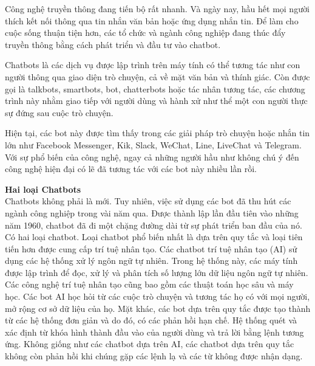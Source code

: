 Công nghệ truyền thông đang tiến bộ rất nhanh. Và ngày nay, hầu hết mọi người thích kết nối thông qua tin nhắn văn bản hoặc ứng dụng nhắn tin.
Để làm cho cuộc sống thuận tiện hơn, các tổ chức và ngành công nghiệp đang thúc đẩy truyền thông bằng cách phát triển và đầu tư vào chatbot.

Chatbots là các dịch vụ được lập trình trên máy tính có thể tương tác như con người thông qua giao diện trò chuyện, cả về mặt văn bản và thính giác. Còn được gọi là talkbots, smartbots, bot, chatterbots hoặc tác nhân tương tác, các chương trình này nhằm giao tiếp với người dùng và hành xử như thể một con người thực sự đứng sau cuộc trò chuyện.

Hiện tại, các bot này được tìm thấy trong các giải pháp trò chuyện hoặc nhắn tin lớn như Facebook Messenger, Kik, Slack, WeChat, Line, LiveChat và Telegram. Với sự phổ biến của công nghệ, ngay cả những người hầu như không chú ý đến công nghệ hiện đại có lẽ đã tương tác với các bot này nhiều lần rồi.

\textbf{Hai loại Chatbots} \\[0.2em]
Chatbots không phải là mới. Tuy nhiên, việc sử dụng các bot đã thu hút các ngành công nghiệp trong vài năm qua. Được thành lập lần đầu tiên vào những năm 1960, chatbot đã đi một chặng đường dài từ sự phát triển ban đầu của nó. Có hai loại chatbot. Loại chatbot phổ biến nhất là dựa trên quy tắc và loại tiên tiến hơn được cung cấp trí tuệ nhân tạo.
Các chatbot trí tuệ nhân tạo (AI) sử dụng các hệ thống xử lý ngôn ngữ tự nhiên. Trong hệ thống này, các máy tính được lập trình để đọc, xử lý và phân tích số lượng lớn dữ liệu ngôn ngữ tự nhiên. Các công nghệ trí tuệ nhân tạo cũng bao gồm các thuật toán học sâu và máy học. Các bot AI học hỏi từ các cuộc trò chuyện và tương tác họ có với mọi người, mở rộng cơ sở dữ liệu của họ.
Mặt khác, các bot dựa trên quy tắc được tạo thành từ các hệ thống đơn giản và do đó, có các phản hồi hạn chế. Hệ thống quét và xác định từ khóa hình thành đầu vào của người dùng và trả lời bằng lệnh tương ứng. Không giống như các chatbot dựa trên AI, các chatbot dựa trên quy tắc không còn phản hồi khi chúng gặp các lệnh lạ và các từ không được nhận dạng.

